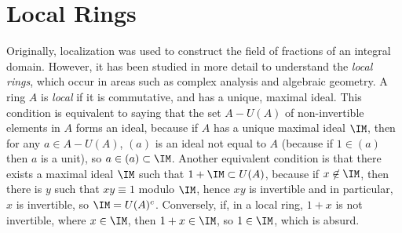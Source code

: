 
\section{Local Rings}

Originally, localization was used to construct the field of fractions of an integral domain. However, it has been studied in more detail to understand the \emph{local rings}, which occur in areas such as complex analysis and algebraic geometry. A ring $A$ is \emph{local} if it is commutative, and has a unique, maximal ideal. This condition is equivalent to saying that the set $A - U(A)$ of non-invertible elements in $A$ forms an ideal, because if $A$ has a unique maximal ideal $\IM$, then for any $a \in A - U(A)$, $(a)$ is an ideal not equal to $A$ (because if $1 \in (a)$ then $a$ is a unit), so $a \in (a) \subset \IM$. Another equivalent condition is that there exists a maximal ideal $\IM$ such that $1 + \IM \subset U(A)$, because if $x \not \in \IM$, then there is $y$ such that $xy \equiv 1$ modulo $\IM$, hence $xy$ is invertible and in particular, $x$ is invertible, so $\IM = U(A)^c$. Conversely, if, in a local ring, $1 + x$ is not invertible, where $x \in \IM$, then $1 + x \in \IM$, so $1 \in \IM$, which is absurd.

